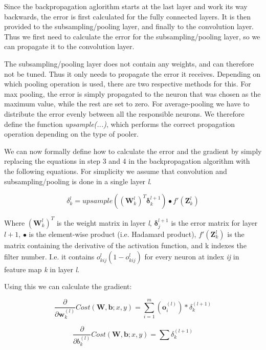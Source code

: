 Since the backpropagation aglorithm starts at the last layer and work its way backwards, the error is first calculated for the fully connected layers. It is then provided to the subsampling/pooling layer, and finally to the convolution layer. Thus we first need to calculate the error for the subsampling/pooling layer, so we can propagate it to the convolution layer. 

The subsampling/pooling layer does not contain any weights, and can therefore not be tuned. Thus it only needs to propagate the error it receives. Depending on which pooling operation is used, there are two respective methods for this. For max pooling, the error is simply propagated to the neuron that was chosen as the maximum value, while the rest are set to zero. For average-pooling we have to distribute the error evenly between all the responsible neurons. We therefore define the function \textit{upsample(...)}, which performs the correct propagation operation depending on the type of pooler. 

We can now formally define how to calculate the error and the gradient by simply replacing the equations in step 3 and 4 in the backpropagation algorithm with the following equations. For simplicity we assume that convolution and subsampling/pooling is done in a single layer \textit{l}.




\begin{equation}
	\delta_{k}^{l} =  upsample( (\mathbf{W}_{k}^l)^T \mathbf{\delta}_{k}^{l+1})\bullet f'(\mathbf{Z}_k^l)
\end{equation}

Where $  (\mathbf{W}_{k}^l)^T $ is the weight matrix in layer \textit{l}, $  \mathbf{\delta}_{j}^{l+1} $ is the error matrix for layer $ l + 1 $, $ \bullet $ is the element-wise product (i.e. Hadamard product), $ f'(\mathbf{Z}_k^l) $ is the matrix containing the derivative of the activation function, and k indexes the filter number. I.e. it contains $ o_{kij}^l(1-o_{kij}^l) $ for every neuron at index \textit{ij} in feature map \textit{k} in layer \textit{l}. 

Using this we can calculate the gradient:

\begin{equation}
	\frac{\partial}{\partial \mathbf{w}_k^{(l)} }Cost(\mathbf{W,b}; x, y) = \sum_{i=1}^{m}(\mathbf{o}_i^{(l)})*\delta_k^{(l+1)}
\end{equation}

\begin{equation}
	\frac{\partial}{\partial b_k^{(l)} }Cost(\mathbf{W,b}; x, y) = \sum\delta_k^{(l+1)}
\end{equation}

